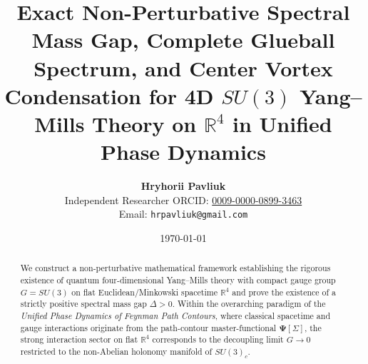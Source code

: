 \documentclass[11pt,a4paper]{article}
\title{\textbf{Exact Non-Perturbative Spectral Mass Gap, Complete Glueball Spectrum, and Center Vortex Condensation for 4D $SU(3)$ Yang--Mills Theory on $\mathbb{R}^4$ in Unified Phase Dynamics}}
\author{\textbf{Hryhorii Pavliuk}\\[0.4em]
\small Independent Researcher \quad\textbar\quad \small ORCID: \href{https://orcid.org/0009-0000-0899-3463}{0009-0000-0899-3463}\\
\small Email: \texttt{hrpavliuk@gmail.com} }
\date{\today}
\begin{document}
\maketitle

\begin{abstract}
We construct a non-perturbative mathematical framework establishing the rigorous existence of quantum four-dimensional Yang--Mills theory with compact gauge group $G = SU(3)$ on flat Euclidean/Minkowski spacetime $\mathbb{R}^4$ and prove the existence of a strictly positive spectral mass gap $\Delta > 0$. Within the overarching paradigm of the \textit{Unified Phase Dynamics of Feynman Path Contours}, where classical spacetime and gauge interactions originate from the path-contour master-functional $\mathbf{\Psi}[\Sigma]$, the strong interaction sector on flat $\mathbb{R}^4$ corresponds to the decoupling limit $G \to 0$ restricted to the non-Abelian holonomy manifold of $SU(3)_c$.


\end{abstract}
\end{document}
